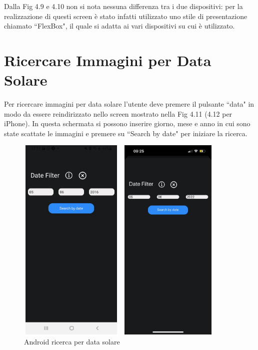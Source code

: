 Dalla Fig 4.9 e 4.10 non si nota nessuna differenza tra i due dispositivi: per la realizzazione di questi screen \`e stato infatti utilizzato uno stile di
presentazione chiamato ``FlexBox", il quale si adatta ai vari dispositivi su cui \`e utilizzato.

\section*{Ricercare Immagini per Data Solare}
Per ricercare immagini per data solare l'utente deve premere il pulsante ``data" in modo da essere reindirizzato nello screen mostrato nella Fig 4.11 (4.12 per iPhone). 
In questa schermata si possono inserire giorno, mese e anno in cui sono state scattate le immagini e premere su ``Search by date" per iniziare la ricerca.
\begin{figure}[h]
    \begin{minipage}[h]{0.47\textwidth}
        \centering
        \includegraphics[width=5cm, height=10cm]{images/immaginiAndroid/SearchbyDate.jpg}
        \caption{\label{SearchbyDateAndroid} Android ricerca per data solare}
    \end{minipage}
    \hfill
    \begin{minipage}[h]{0.47\textwidth}
        \centering
        \includegraphics[width=5cm, height=10cm]{images/immaginiPhone/SearchbyDate.jpeg}

\end{minipage}
\end{figure}
